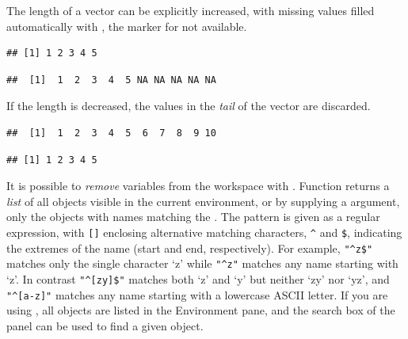 \documentclass[krantz2]{krantz}\usepackage{knitr}
\begin{document}
\begin{explainbox}
The length of a vector can be explicitly increased, with missing values filled automatically with , the marker for not available.

\begin{knitrout}\footnotesize
{}\color{fgcolor}\begin{kframe}
\begin{alltt}
 \hlkwb{<-} \hlopt{:}
\end{alltt}
\begin{verbatim}
## [1] 1 2 3 4 5
\end{verbatim}
\begin{alltt}
 \hlkwb{<-} 
\end{alltt}
\begin{verbatim}
##  [1]  1  2  3  4  5 NA NA NA NA NA
\end{verbatim}
\end{kframe}
\end{knitrout}

If the length is decreased, the values in the \emph{tail} of the vector are discarded.

\begin{knitrout}\footnotesize
{}\color{fgcolor}\begin{kframe}
\begin{alltt}
 \hlkwb{<-} \hlopt{:}
\end{alltt}
\begin{verbatim}
##  [1]  1  2  3  4  5  6  7  8  9 10
\end{verbatim}
\begin{alltt}
 \hlkwb{<-} 
\end{alltt}
\begin{verbatim}
## [1] 1 2 3 4 5
\end{verbatim}
\end{kframe}
\end{knitrout}

\end{explainbox}
\label{par:numeric:vectors:end}

It is possible to \emph{remove} variables from the workspace with . Function  returns a \emph{list} of all objects visible in the current environment, or by supplying a  argument, only the objects with names matching the . The pattern is given as a regular expression, with \verb|[]| enclosing alternative matching characters, \verb|^| and \verb|$|, indicating the extremes of the name (start and end, respectively). For example, \verb|"^z$"| matches only the single character `z' while \verb|"^z"| matches any name starting with `z'. In contrast \verb|"^[zy]$"| matches both `z' and `y' but neither `zy' nor `yz', and \verb|"^[a-z]"| matches any name starting with a lowercase ASCII letter. If you are using , all objects are listed in the Environment pane, and the search box of the panel can be used to find a given object.
\end{document}
